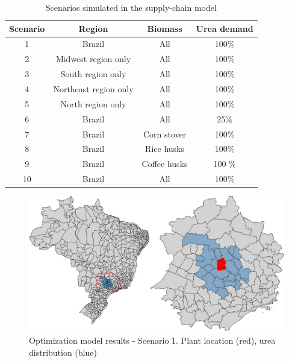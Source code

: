 \documentclass[a4paper, titlepage]{article}
\begin{document}
\begin{table}
    \centering
    \caption{Scenarios simulated in the supply-chain model}
    \label{tab_scenarios}
    \begin{tabular}{||c | c | c | c ||}
        \hline
        Scenario & Region                & Biomass      & Urea demand \\
        \hline
        1        & Brazil                & All          & 100\%       \\
        2        & Midwest region only   & All          & 100\%       \\
        3        & South region only     & All          & 100\%       \\
        4        & Northeast region only & All          & 100\%       \\
        5        & North region only     & All          & 100\%       \\
        6        & Brazil                & All          & 25\%        \\
        7        & Brazil                & Corn stover  & 100\%       \\
        8        & Brazil                & Rice husks   & 100\%       \\
        9        & Brazil                & Coffee husks & 100 \%      \\
        10       & Brazil                & All          & 100\%       \\
        \hline
    \end{tabular}
\end{table}

\begin{figure}[htb]
    \includegraphics[width=\textwidth]{img/optimization_result_1.png}
    \caption{Optimization model results - Scenario 1. Plant location (red), urea distribution (blue)}
    \label{img_optimizationresults_1}
\end{figure}
\end{document}
